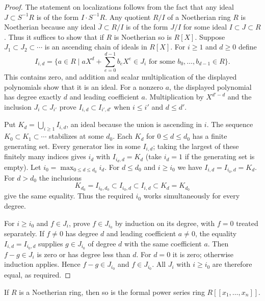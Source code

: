 \begin{proof}
The statement on localizations follows from the fact
that any ideal $J \subset S^{-1}R$ is of the form
$I \cdot S^{-1}R$. Any quotient $R/I$ of a Noetherian
ring $R$ is Noetherian because any ideal $\overline{J} \subset R/I$
is of the form $J/I$ for some ideal $I \subset J \subset R$.
Thus it suffices to show that if $R$ is Noetherian so
is $R[X]$. Suppose $J_1\subset J_2\subset\cdots$ is an ascending
chain of ideals in $R[X]$. For $i\geq1$ and $d\geq0$ define
$$
I_{i,d}=\{a\in R\mid aX^d+\sum_{e=0}^{d-1}b_eX^e\in J_i
\text{ for some }b_0,\ldots,b_{d-1}\in R\}.
$$
This contains zero, and addition and scalar multiplication of the
displayed polynomials show that it is an ideal. For a nonzero $a$,
the displayed polynomial has degree exactly $d$ and leading
coefficient $a$. Multiplication by $X^{d'-d}$ and the inclusion
$J_i\subset J_{i'}$ prove $I_{i,d}\subset I_{i',d'}$ when
$i\leq i'$ and $d\leq d'$.

\medskip\noindent
Put $K_d=\bigcup_{i\geq1}I_{i,d}$, an ideal because the union is
ascending in $i$. The sequence $K_0\subset K_1\subset\cdots$
stabilizes at some $d_0$. Each $K_d$ for $0\leq d\leq d_0$ has a
finite generating set. Every generator lies in some $I_{i,d}$;
taking the largest of these finitely many indices gives $i_d$ with
$I_{i_d,d}=K_d$ (take $i_d=1$ if the generating set is empty).
Let $i_0=\max_{0\leq d\leq d_0}i_d$. For $d\leq d_0$ and
$i\geq i_0$ we have $I_{i,d}=I_{i_0,d}=K_d$.
For $d>d_0$ the inclusions
$$
K_{d_0}=I_{i_0,d_0}\subset I_{i_0,d}\subset I_{i,d}
\subset K_d=K_{d_0}
$$
give the same equality. Thus the required $i_0$ works simultaneously
for every degree.

\medskip\noindent
For $i\geq i_0$ and $f\in J_i$, prove $f\in J_{i_0}$ by induction
on its degree, with $f=0$ treated separately. If $f\ne0$ has degree
$d$ and leading coefficient $a\ne0$, the equality
$I_{i,d}=I_{i_0,d}$ supplies $g\in J_{i_0}$ of degree $d$ with
the same coefficient $a$. Then $f-g\in J_i$ is zero or has degree
less than $d$. For $d=0$ it is zero; otherwise induction applies.
Hence $f-g\in J_{i_0}$ and $f\in J_{i_0}$. All $J_i$ with
$i\geq i_0$ are therefore equal, as required.
\end{proof}

\begin{lemma}
\label{editorial-source-lemma-Noetherian-power-series}
If $R$ is a Noetherian ring, then so is the formal power
series ring $R[[x_1, \ldots, x_n]]$.
\end{lemma}

